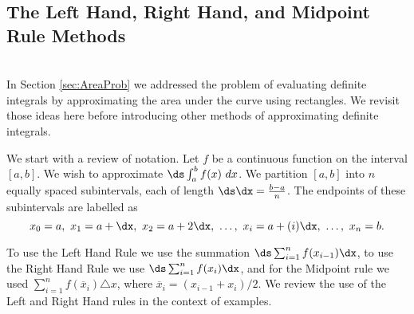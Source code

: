 \subsection*{The Left Hand, Right Hand, and Midpoint Rule Methods}\\

In Section \ref{sec:AreaProb} we addressed the problem of evaluating definite integrals by approximating the area under the curve using rectangles. We revisit those ideas here before introducing other methods of approximating definite integrals. 

We start with a review of notation. Let $f$ be a continuous function on the interval $[a,b]$. We wish to approximate $\ds \int_a^b f(x)\ dx$. We partition $[a,b]$ into $n$ equally spaced subintervals, each of length $\ds\dx = \frac{b-a}{n}$. The endpoints of these subintervals are labelled as $$x_0=a,\ x_1 = a+\dx,\ x_2 = a+ 2\dx,\ \ldots,\ x_i = a+(i)\dx,\ \ldots,\ x_{n} = b.$$

To use the Left Hand Rule we use the summation $\ds \sum_{i=1}^n f(x_{i-1})\dx$,  to use the Right Hand Rule we use $\ds \sum_{i=1}^n f(x_{i})\dx$, and for the Midpoint rule we used $ \sum_{i = 1}^{n} f(\overline{x}_i) \triangle x $, where  $\overline{x}_{i} = (x_{i-1} + x_i)/2$. We review the use of the Left and Right Hand rules in the context of examples.\\

